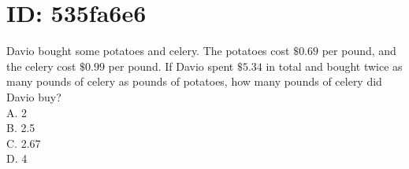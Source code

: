\section*{ID: 535fa6e6}
Davio bought some potatoes and celery. The potatoes cost $\$ 0.69$ per pound, and the celery cost $\$ 0.99$ per pound. If Davio spent $\$ 5.34$ in total and bought twice as many pounds of celery as pounds of potatoes, how many pounds of celery did Davio buy?\\
A. 2\\
B. 2.5\\
C. 2.67\\
D. 4


